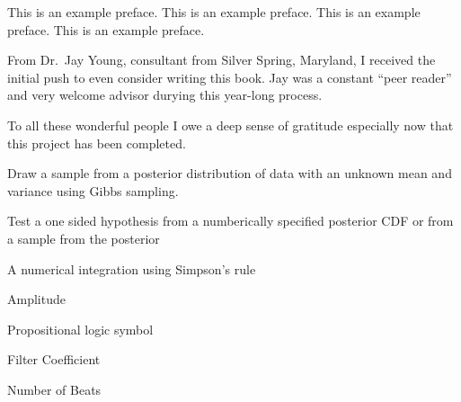 \documentclass{book}
\begin{document}
\begin{preface}
This is an example preface.
This is an example preface.
This is an example preface.
This is an example preface.


\end{preface}


\begin{acknowledgments}
From Dr.~Jay Young, consultant from Silver Spring, Maryland, I received
the initial push to even consider writing this book. Jay was a constant
``peer reader'' and very welcome advisor durying this year-long process.


To all these wonderful people I owe a deep sense of gratitude especially now
that this project has been completed.
\end{acknowledgments}

\begin{acronyms}
\end{acronyms}

\begin{glossary}
Draw a sample from a posterior distribution
of data with an unknown mean and variance using Gibbs sampling.

Test a one sided hypothesis from a numberically
specified posterior CDF or from a sample from the posterior

A numerical integration using Simpson's rule
\end{glossary}

\begin{symbols}
Amplitude

\term{\hbox{\&}}Propositional logic symbol 

Filter Coefficient

\bigskip

Number of Beats
\end{symbols}
\end{document}
